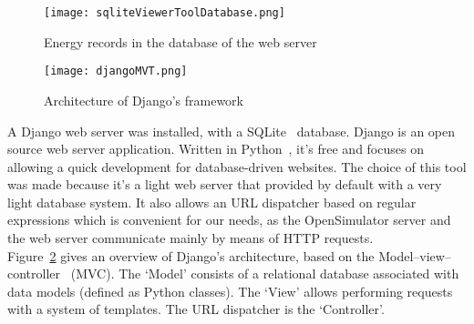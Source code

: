 \begin{figure}[!h]
  \caption{Energy records in the database of the web server}
  \centering
  \texttt{[image: sqliteViewerToolDatabase.png]}
  \label{fig:sqliteViewerToolDatabase}
\end{figure}

\begin{figure}[!h]
  \caption{Architecture of Django's framework}
  \centering
  \texttt{[image: djangoMVT.png]}
  \label{fig:djangoMVT}
\end{figure}


A Django web server was installed, with a SQLite~\cite{sqliteWebsite} database. Django is an open source web server application. Written in Python~\cite{pythonWebsite}, it's free and focuses on allowing a quick development for database-driven websites. 
The choice of this tool was made because it's a light web server that provided by default with a very light database system. It also allows an URL dispatcher based on regular expressions which is convenient for our needs, as the OpenSimulator server and the web server communicate mainly by means of HTTP requests.\\

Figure~\ref{fig:djangoMVT} gives an overview of Django's architecture, based on the Model–view–controller~\cite{deacon2009model} (MVC). The `Model' consists of a relational database associated with data models (defined as Python classes). The `View' allows performing requests with a system of templates. The URL dispatcher is the `Controller'.
